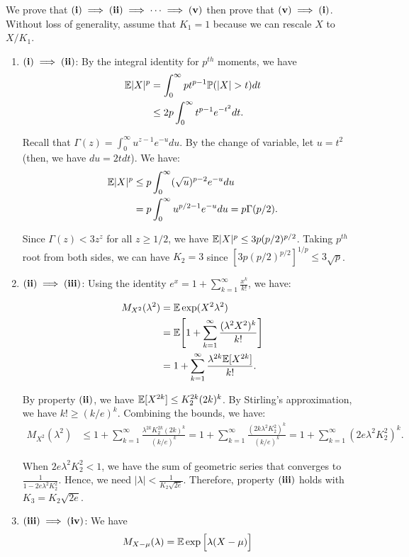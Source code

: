 \begin{proof*}
	We prove that ${\bf (i)}\implies{\bf (ii)}\implies\dots\implies{\bf (v)}$ then prove that ${\bf (v)}\implies{\bf (i)}$. Without loss of generality, assume that $K_1=1$ because we can rescale $X$ to $X/K_1$.
	\begin{enumerate}
		\item ${\bf (i)}\implies{\bf (ii)}$: By the integral identity for $p^{th}$ moments, we have
		\begin{align*}
			\E|X|^p &= \int_0^\infty pt^{p-1}\Pm(|X|>t)dt \\
				&\le 2p\int_0^\infty t^{p-1}e^{-t^2}dt.
		\end{align*}

		\noindent Recall that $\Gamma(z) = \int_0^\infty u^{z-1}e^{-u}du$. By the change of variable, let $u=t^2$ (then, we have $du = 2tdt$). We have:
		\begin{align*}
			\mathbb{E}|X|^p &\le p\int_0^\infty (\sqrt{u})^{p-2}e^{-u}du \\
				&= p\int_0^\infty u^{p/2 - 1}e^{-u}du = p\Gamma(p/2).
		\end{align*} 

		\noindent Since $\Gamma(z) < 3z^z$ for all $z\ge 1/2$, we have $\mathbb{E}|X|^p \le 3p(p/2)^{p/2}$. Taking $p^{th}$ root from both sides, we can have $K_2=3$ since $[3p(p/2)^{p/2}]^{1/p} \le 3\sqrt{p}$.

		\item ${\bf (ii)}\implies{\bf (iii)}$: Using the identity $e^x = 1 + \sum_{k=1}^\infty \frac{x^k}{k!}$, we have:

		\begin{align*}
			M_{X^2}(\lambda^2) &= \mathbb{E}\exp(X^2\lambda^2) \\
				&= \mathbb{E}\Bigg[ 
					1 + \sum_{k=1}^\infty \frac{(\lambda^2X^2)^k}{k!}
				 \Bigg] \\
				&= 1 + \sum_{k=1}^\infty \frac{\lambda^{2k} \mathbb{E}[X^{2k}]}{k!}.
		\end{align*} 

		\noindent By property ${\bf (ii)}$, we have $\mathbb{E}[X^{2k}] \le K_2^{2k}(2k)^{k}$. By Stirling's approximation, we have $k!\ge(k/e)^k$. Combining the bounds, we have:
		\begin{align*}
			M_{X^2}(\lambda^2) &\le 1 + \sum_{k=1}^\infty \frac{\lambda^{2k}K_2^{2k}(2k)^k}{(k/e)^k}= 1 + \sum_{k=1}^\infty \frac{(2k\lambda^2K_2^2)^k}{(k/e)^k} = 1 + \sum_{k=1}^\infty (2e\lambda^2K_2^2)^k.
		\end{align*} 

		\noindent When $2e\lambda^2K_2^2 < 1$, we have the sum of geometric series that converges to $\frac{1}{1 - 2e\lambda^2K_2^2}$. Hence, we need $|\lambda| < \frac{1}{K_2\sqrt{2e}}$. Therefore, property $\bf (iii)$ holds with $K_3 = K_2\sqrt{2e}$.

		\item ${\bf (iii)}\implies {\bf (iv)}$: We have
		\begin{align*}
			M_{X-\mu}(\lambda) &= \mathbb{E}\exp\Big[ \lambda(X - \mu) \Big]	
		\end{align*} 
	\end{enumerate} 
\end{proof*} 
